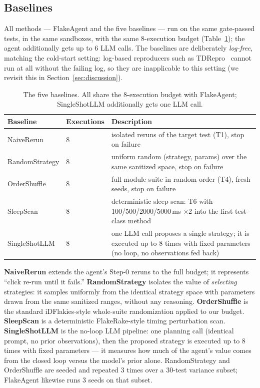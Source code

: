 \subsection{Baselines}

All methods — FlakeAgent and the five baselines — run on the same gate-passed
tests, in the same sandboxes, with the same 8-execution budget
(Table~\ref{tab:baselines}); the agent additionally gets up to 6 LLM calls.
The baselines are deliberately \emph{log-free}, matching the cold-start
setting: log-based reproducers such as TDRepro~\cite{chen2024tdrepro} cannot
run at all without the failing log, so they are inapplicable to this setting
(we revisit this in Section~\ref{sec:discussion}).

\begin{table}[t]
\caption{The five baselines. All share the 8-execution budget with
FlakeAgent; SingleShotLLM additionally gets one LLM call.}
\label{tab:baselines}
\small
\begin{tabular}{@{}llp{7.6cm}@{}}
\toprule
\textbf{Baseline} & \textbf{Executions} & \textbf{Description}\\
\midrule
NaiveRerun & 8 & isolated reruns of the target test (T1), stop on failure\\
RandomStrategy & 8 & uniform random (strategy, params) over the same sanitized space, stop on failure\\
OrderShuffle & 8 & full module suite in random order (T4), fresh seeds, stop on failure\\
SleepScan & 8 & deterministic sleep scan: T6 with 100/500/2000/5000\,ms $\times$2 into the first test-class method\\
SingleShotLLM & 8 & one LLM call proposes a single strategy; it is executed up to 8 times with fixed parameters (no loop, no observations fed back)\\
\bottomrule
\end{tabular}
\end{table}

\textbf{NaiveRerun} extends the agent's Step-0 reruns to the full budget;
it represents ``click re-run until it fails.'' \textbf{RandomStrategy}
isolates the value of \emph{selecting} strategies: it samples uniformly from
the identical strategy space with parameters drawn from the same sanitized
ranges, without any reasoning. \textbf{OrderShuffle} is the standard
iDFlakies-style whole-suite randomization applied to our budget.
\textbf{SleepScan} is a deterministic FlakeRake-style timing perturbation
scan. \textbf{SingleShotLLM} is the no-loop LLM pipeline: one planning call
(identical prompt, no prior observations), then the proposed strategy is
executed up to 8 times with fixed parameters — it measures how much of the
agent's value comes from the closed loop versus the model's prior alone.
RandomStrategy and OrderShuffle are seeded and repeated 3 times over a
30-test variance subset; FlakeAgent likewise runs 3 seeds on that subset.

